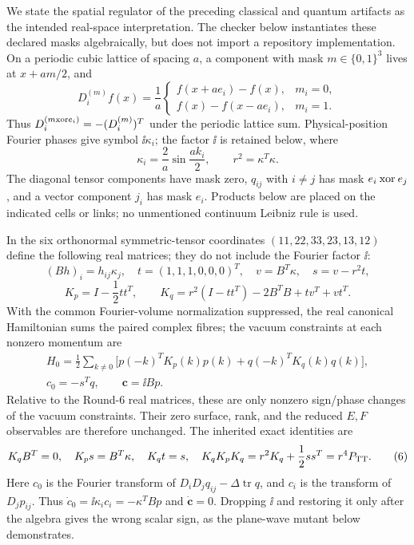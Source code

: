 We state the spatial regulator of the preceding classical and quantum
artifacts as the intended real-space interpretation.  The checker below
instantiates these declared masks algebraically, but does not import a
repository implementation.  On a periodic cubic lattice of spacing $a$, a component with mask
$m\in\{0,1\}^3$ lives at $x+am/2$, and
\[
 D_i^{(m)}f(x)=\frac1a
 \begin{cases}
 f(x+ae_i)-f(x),&m_i=0,\\
 f(x)-f(x-ae_i),&m_i=1.
 \end{cases}                                      \tag{1}
\]
Thus $D_i^{(m\mathbin{\rm xor}e_i)}=-(D_i^{(m)})^T$ under the periodic
lattice sum.  Physical-position Fourier phases give symbol
$\ii\kappa_i$; the factor $\ii$ is retained below, where
\[
 \kappa_i=\frac2a\sin\frac{ak_i}{2},\qquad
 r^2=\kappa^T\kappa.                              \tag{2}
\]
The diagonal tensor components have mask zero, $q_{ij}$ with $i\ne j$ has
mask $e_i\mathbin{\rm xor}e_j$, and a vector component $j_i$ has mask $e_i$.
Products below are placed on the indicated cells or links; no unmentioned
continuum Leibniz rule is used.

In the six orthonormal symmetric-tensor coordinates
$(11,22,33,23,13,12)$ define the following real matrices; they do not include
the Fourier factor $\ii$:
\[
 (Bh)_i=h_{ij}\kappa_j,\quad
 t=(1,1,1,0,0,0)^T,\quad v=B^T\kappa,\quad
 s=v-r^2t,                                         \tag{3}
\]
\[
 K_p=I-\frac12tt^T,\qquad
 K_q=r^2(I-tt^T)-2B^TB+tv^T+vt^T.                 \tag{4}
\]
With the common Fourier-volume normalization suppressed, the real canonical
Hamiltonian sums the paired complex fibres; the vacuum constraints at each
nonzero momentum are
\[
 \begin{gathered}
 H_0=\frac12\sum_{k\ne0}
 \bigl[p(-k)^TK_p(k)p(k)+q(-k)^TK_q(k)q(k)\bigr],\\
 c_0=-s^Tq,\qquad \boldsymbol c=\ii Bp.
 \end{gathered}                                      \tag{5}
\]
Relative to the Round-6 real matrices, these are only nonzero sign/phase
changes of the vacuum constraints.  Their zero surface, rank, and the reduced
$E,F$ observables are therefore unchanged.
The inherited exact identities are
\[
 K_qB^T=0,\quad K_ps=B^T\kappa,\quad K_qt=s,
\quad K_qK_pK_q=r^2K_q+\frac12ss^T=r^4P_{\mathrm{TT}}.    \tag{6}
\]
Here $c_0$ is the Fourier transform of
$D_iD_jq_{ij}-\Delta\operatorname{tr}q$, and $c_i$ is the transform of
$D_jp_{ij}$.  Thus
$\dot c_0=\ii\kappa_i c_i=-\kappa^TBp$ and
$\dot {\boldsymbol c}=0$.  Dropping $\ii$ and restoring it only after the algebra
gives the wrong scalar sign, as the plane-wave mutant below demonstrates.

